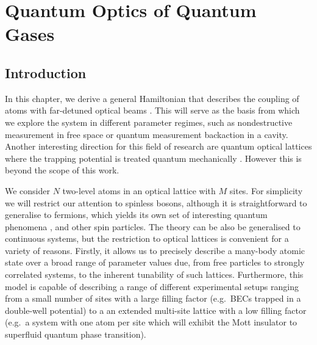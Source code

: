 
\chapter{Quantum Optics of Quantum Gases}  

\ifpdf
    \graphicspath{{Chapter2/Figs/Raster/}{Chapter2/Figs/PDF/}{Chapter2/Figs/}}
\else
    \graphicspath{{Chapter2/Figs/Vector/}{Chapter2/Figs/}}
\fi

\section{Introduction}

In this chapter, we derive a general Hamiltonian that describes the
coupling of atoms with far-detuned optical beams
\cite{mekhov2012}. This will serve as the basis from which we explore
the system in different parameter regimes, such as nondestructive
measurement in free space or quantum measurement backaction in a
cavity. Another interesting direction for this field of research are
quantum optical lattices where the trapping potential is treated
quantum mechanically \cite{caballero2015, caballero2015njp,
  caballero2016, caballero2016a}. However this is beyond the scope of
this work.

We consider $N$ two-level atoms in an optical lattice with $M$
sites. For simplicity we will restrict our attention to spinless
bosons, although it is straightforward to generalise to fermions,
which yields its own set of interesting quantum phenomena
\cite{atoms2015, mazzucchi2016, mazzucchi2016af}, and other spin
particles. The theory can be also be generalised to continuous
systems, but the restriction to optical lattices is convenient for a
variety of reasons. Firstly, it allows us to precisely describe a
many-body atomic state over a broad range of parameter values due,
from free particles to strongly correlated systems, to the inherent
tunability of such lattices. Furthermore, this model is capable of
describing a range of different experimental setups ranging from a
small number of sites with a large filling factor (e.g.~BECs trapped
in a double-well potential) to a an extended multi-site lattice with a
low filling factor (e.g.~a system with one atom per site which will
exhibit the Mott insulator to superfluid quantum phase transition).

